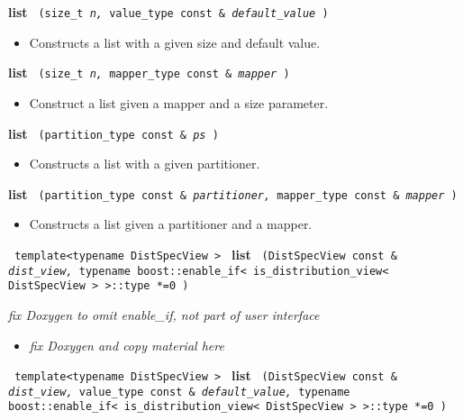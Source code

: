 \noindent
\textbf{list}%
\texttt{%
(size\_t 
\textit{n,}%
value\_type const \&
\textit{default\_value}%
)
}

\begin{itemize}
\item
Constructs a list with a given size and default value. 
\end{itemize}
 
\noindent
\textbf{list}%
\texttt{%
(size\_t 
\textit{n,}%
mapper\_type const \&
\textit{mapper}%
)
}

\begin{itemize}
\item
Construct a list given a mapper and a size parameter. 
\end{itemize}
 
\noindent
\textbf{list}%
\texttt{%
(partition\_type const \&
\textit{ps}%
)
}


\begin{itemize}
\item
Constructs a list with a given partitioner. 
\end{itemize}
 
\noindent
\textbf{list}%
\texttt{%
(partition\_type const \&
\textit{partitioner,}%
mapper\_type const \&
\textit{mapper}%
)
}

\begin{itemize}
\item
Constructs a list given a partitioner and a mapper. 
\end{itemize}
 
\noindent
\texttt{%
template<typename DistSpecView >
}
\newline
\textbf{list}%
\texttt{%
(DistSpecView const \&
\textit{dist\_view,}%
typename boost::enable\_if< is\_distribution\_view< DistSpecView > >::type *=0
)
}

\vspace{0.4cm} \emph{fix Doxygen to omit enable\_if, not part of user interface}
 
\begin{itemize}
\item
\emph{fix Doxygen and copy material here}
\end{itemize}
 
\noindent
\texttt{%
template<typename DistSpecView >
}
\newline
\textbf{list}%
\texttt{%
(DistSpecView const \&
\textit{dist\_view,}%
value\_type const \&
\textit{default\_value,}%
typename boost::enable\_if< is\_distribution\_view< DistSpecView > >::type *=0
)
}

